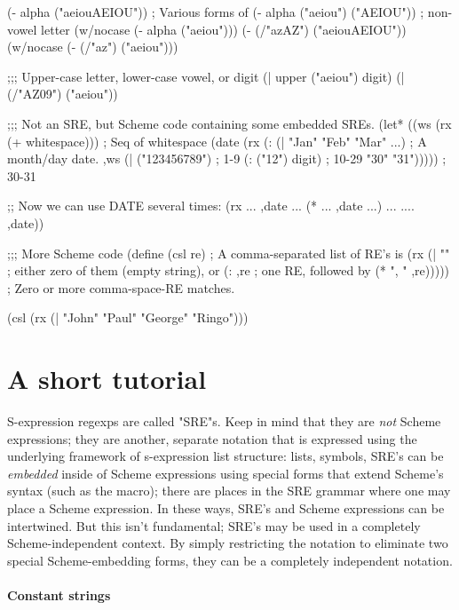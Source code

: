 \begin{widecode}
(- alpha ("aeiouAEIOU"))                ; Various forms of 
(- alpha ("aeiou") ("AEIOU"))           ; non-vowel letter
(w/nocase (- alpha ("aeiou")))
(- (/"azAZ") ("aeiouAEIOU"))
(w/nocase (- (/"az") ("aeiou")))

;;; Upper-case letter, lower-case vowel, or digit
(| upper ("aeiou") digit)
(| (/"AZ09") ("aeiou"))

;;; Not an SRE, but Scheme code containing some embedded SREs.
(let* ((ws (rx (+ whitespace)))                 ; Seq of whitespace
       (date (rx (: (| "Jan" "Feb" "Mar" ...)   ; A month/day date.
                    ,ws
                    (| ("123456789")            ; 1-9
                       (: ("12") digit)         ; 10-29
                       "30" "31")))))           ; 30-31

  ;; Now we can use DATE several times:
  (rx ... ,date ... (* ... ,date ...)       
      ... .... ,date))

;;; More Scheme code
(define (csl re)                ; A comma-separated list of RE's is
  (rx (| ""                     ; either zero of them (empty string), or
         (: ,re                 ; one RE, followed by
            (* ", " ,re)))))    ; Zero or more comma-space-RE matches.

(csl (rx (| "John" "Paul" "George" "Ringo")))\end{widecode}


\section{A short tutorial}

S-expression regexps are called "SRE"s. Keep in mind that they are \emph{not}
Scheme expressions; they are another, separate notation that is expressed
using the underlying framework of s-expression list structure: lists,
symbols, {\etc} SRE's can be \emph{embedded} inside of Scheme expressions using
special forms that extend Scheme's syntax (such as the  macro); 
there are places in the SRE 
grammar where one may place a Scheme expression.
In these ways, SRE's and Scheme expressions can be intertwined. 
But this isn't fundamental; 
SRE's may be used in a completely Scheme-independent context. 
By simply restricting the notation to eliminate two special
Scheme-embedding forms, they can be a completely independent notation.

\paragraph{Constant strings}


